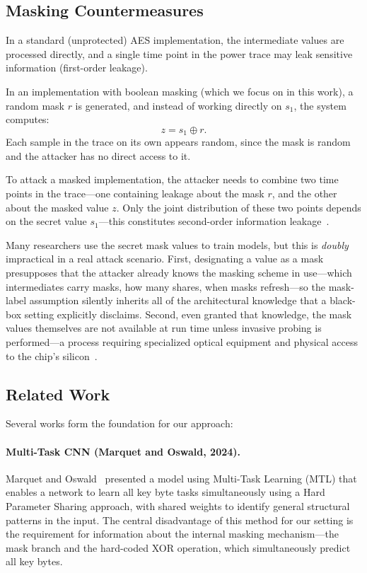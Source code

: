 \documentclass[runningheads]{llncs}
\begin{document}
\subsection{Masking Countermeasures}

In a standard (unprotected) AES implementation, the intermediate values are processed directly, and a single time point in the power trace may leak sensitive information (first-order leakage).

In an implementation with boolean masking (which we focus on in this work), a random mask $r$ is generated, and instead of working directly on $s_1$, the system computes:
\begin{equation}\label{eq:boolean}
  z = s_1 \oplus r.
\end{equation}
Each sample in the trace on its own appears random, since the mask is random and the attacker has no direct access to it.

To attack a masked implementation, the attacker needs to combine two time points in the trace---one containing leakage about the mask $r$, and the other about the masked value $z$.
Only the joint distribution of these two points depends on the secret value $s_1$---this constitutes second-order information leakage~\cite{prouff2009statistical}.

Many researchers use the secret mask values to train models, but this is \emph{doubly} impractical in a real attack scenario.
First, designating a value as a mask presupposes that the attacker already knows the masking scheme in use---which intermediates carry masks, how many shares, when masks refresh---so the mask-label assumption silently inherits all of the architectural knowledge that a black-box setting explicitly disclaims.
Second, even granted that knowledge, the mask values themselves are not available at run time unless invasive probing is performed---a process requiring specialized optical equipment and physical access to the chip's silicon~\cite{lohrke2016noplacetohi,krachenfels2021automatic}.

\subsection{Related Work}

Several works form the foundation for our approach:

\paragraph{Multi-Task CNN (Marquet and Oswald, 2024).}
Marquet and Oswald~\cite{marquet2024exploring} presented a model using Multi-Task Learning (MTL) that enables a network to learn all key byte tasks simultaneously using a Hard Parameter Sharing approach, with shared weights to identify general structural patterns in the input.
The central disadvantage of this method for our setting is the requirement for information about the internal masking mechanism---the mask branch and the hard-coded XOR operation, which simultaneously predict all key bytes.
\end{document}
